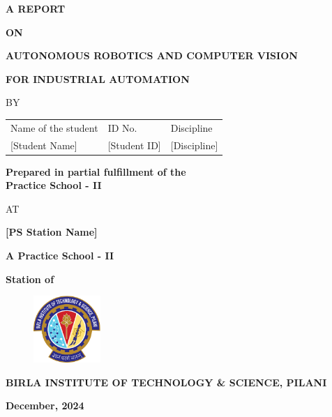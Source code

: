 \documentclass{book}
\begin{document}


\large

\thispagestyle{empty}
\centerline{\bf A REPORT}
\vspace*{0.3cm}
\centerline{\bf ON}
\vspace*{0.3cm}
\centerline{\bf AUTONOMOUS ROBOTICS AND COMPUTER VISION}
\centerline{\bf FOR INDUSTRIAL AUTOMATION}
\vspace*{2cm}

\centerline{BY}
\vspace*{1cm}

\begin{center}
	\begin{tabular}{lll}
		Name of the student & \hspace*{2cm} ID No. & \hspace*{2cm} Discipline \\ 
		{[Student Name]} &\hspace*{2cm} {[Student ID]} &\hspace*{2cm} {[Discipline]} \\
	\end{tabular}
\end{center}

\vspace*{2cm}
\begin{center}
	{\bf Prepared in partial fulfillment of the \\
	Practice School - II}
\end{center}

\vspace*{0.5cm}

\centerline{AT}

\vspace*{1cm}
        \centerline{\bf [PS Station Name]}
	\vspace{0.2cm}
	\centerline{\bf A Practice School - II}
	\vspace{0.2cm}
	\centerline{\bf Station of}
	\vspace{0.5cm}
\begin{figure}[ht]
\centerline{\includegraphics[width=1.0in]{logo.eps}}
\end{figure}

	\centerline{\bf BIRLA INSTITUTE OF TECHNOLOGY \& SCIENCE, PILANI}
	\vspace*{0.5cm}
	\centerline{\bf December, 2024}
	\newpage
\end{document}
